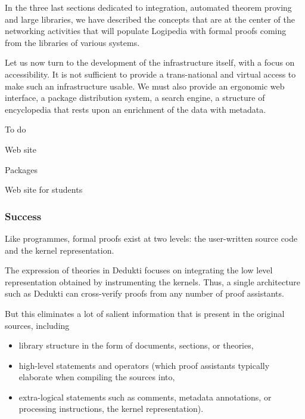 
In the three last sections dedicated to integration, automated theorem
proving and large libraries, we have described the concepts that are
at the center of the networking activities that will populate
Logipedia with formal proofs coming from the libraries of various
systems.

Let us now turn to the development of the infrastructure itself, with
a focus on accessibility. It is not sufficient to provide a
trans-national and virtual access to make such an infrastructure
usable. We must also provide an ergonomic web interface, a package
distribution system, a search engine, a structure of encyclopedia
that rests upon an enrichment of the data with metadata.

{\color{red} To do}

Web site

Packages

Web site for students

\subsubsection*{Success}


Like programmes, formal proofs exist at two levels: the user-written
source code and the kernel representation.

The expression of theories in Dedukti focuses on integrating the low
level representation obtained by instrumenting the kernels.  Thus, a
single architecture such as Dedukti can cross-verify proofs from any
number of proof assistants.

But this eliminates a lot of salient information that is present in
the original sources, including
\begin{itemize}
\item library structure in the form of documents, sections, or
  theories,

\item high-level statements and operators (which proof assistants
  typically elaborate when compiling the sources into,

\item extra-logical statements such as comments, metadata annotations,
  or processing instructions, the kernel representation).
\end{itemize}

